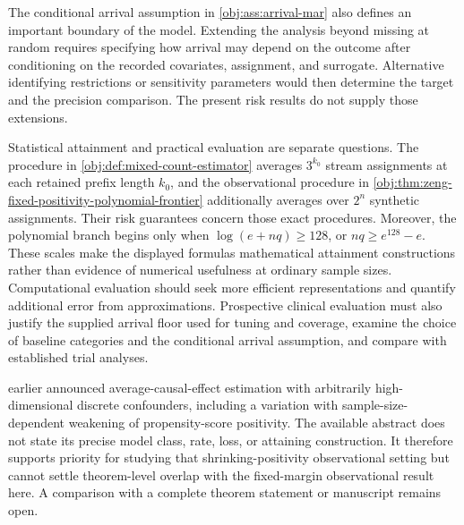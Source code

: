 The conditional arrival assumption in \cref{obj:ass:arrival-mar} also defines an important boundary of the model. Extending the analysis beyond missing at random requires specifying how arrival may depend on the outcome after conditioning on the recorded covariates, assignment, and surrogate. Alternative identifying restrictions or sensitivity parameters would then determine the target and the precision comparison. The present risk results do not supply those extensions.

Statistical attainment and practical evaluation are separate questions. The procedure in \cref{obj:def:mixed-count-estimator} averages \(3^{k_0}\) stream assignments at each retained prefix length \(k_0\), and the observational procedure in \cref{obj:thm:zeng-fixed-positivity-polynomial-frontier} additionally averages over \(2^n\) synthetic assignments. Their risk guarantees concern those exact procedures. Moreover, the polynomial branch begins only when \(\log(e+nq)\ge128\), or \(nq\ge e^{128}-e\). These scales make the displayed formulas mathematical attainment constructions rather than evidence of numerical usefulness at ordinary sample sizes. Computational evaluation should seek more efficient representations and quantify additional error from approximations. Prospective clinical evaluation must also justify the supplied arrival floor used for tuning and coverage, examine the choice of baseline categories and the conditional arrival assumption, and compare with established trial analyses.

\citet[abstract 300411]{Kennedy2019DiscreteAbstract} earlier announced average-causal-effect estimation with arbitrarily high-dimensional discrete confounders, including a variation with sample-size-dependent weakening of propensity-score positivity. The available abstract does not state its precise model class, rate, loss, or attaining construction. It therefore supports priority for studying that shrinking-positivity observational setting but cannot settle theorem-level overlap with the fixed-margin observational result here. A comparison with a complete theorem statement or manuscript remains open.
